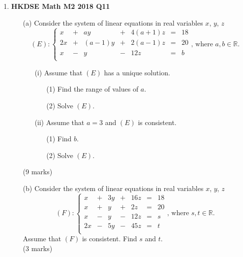 \documentclass{report}
\begin{document}
\begin{enumerate}
	\newpage

	\item \textbf{HKDSE Math M2 2018 Q11}
	\begin{enumerate}
		\item [(a)]Consider the system of linear equations in real variables $x$, $y$, $z$
		$$(E) : \left\{\begin{matrix}
		x&  +&ay&  +&4(a+1)z& = &18  \\
		2x& +&(a-1)y&  +&2(a-1)z& = & 20 \\
		x&  -&y&  -&12z& = & b \\
		\end{matrix}\right.\text{, where }a,b \in \mathbb{R}. $$
		\begin{enumerate}
			\item [(i)]Assume that $(E)$ has a unique solution.
			\begin{enumerate}
				\item [(1)]Find the range of values of $a$. 
				\item [(2)]Solve $(E)$. 
			\end{enumerate}			
			\item [(ii)]Assume that $a = 3 $ and $(E)$ is consistent.
			\begin{enumerate}
				\item [(1)]Find $b$. 
				\item [(2)]Solve $(E)$.
			\end{enumerate}
		\end{enumerate}
		(9 marks)
		\item [(b)]Consider the system of linear equations in real variables $x$, $y$, $z$
		$$(F) : \left\{\begin{matrix}
		x&  +&	3y&	+&	16z&	=& 18  \\
		x& 	+&	y&	+&	2z&		=& 20 \\
		x&  -&	y&  -&	12z&	=& s \\
		2x& -&	5y& -&	45z&	=& t \\
		\end{matrix}\right.\text{, where }s,t \in \mathbb{R}.$$
		Assume that $(F)$ is consistent. Find $s$ and $t$. \\(3 marks)
	\end{enumerate}


\end{enumerate}
\end{document}
